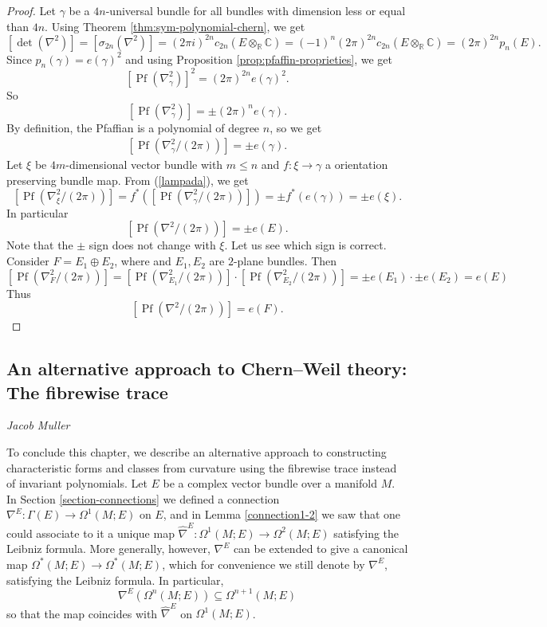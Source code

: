 \documentclass[a4paper,openany]{scrbook}
\newcommand{\chapterauthor}[1]{\hfill\emph{#1}\par\noindent}
\begin{document}
\begin{proof}
    Let $\gamma$ be a $4n$-universal bundle for all bundles with dimension less or equal than $4n$. Using Theorem \ref{thm:sym-polynomial-chern}, we get
    $$[\det(\nabla^2)] = [\sigma_{2n}(\nabla^2)] = (2\pi i)^{2n}c_{2n}(E \otimes_{\mathbb{R}} \mathbb{C}) = (-1)^n(2\pi)^{2n}c_{2n}(E \otimes_{\mathbb{R}} \mathbb{C}) = (2\pi)^{2n}p_n(E).$$
    Since $p_n(\gamma) = e(\gamma)^2$ and using Proposition \ref{prop:pfaffin-proprieties}, we get
    $$[\operatorname{Pf}(\nabla_\gamma^2)]^2 = (2\pi)^{2n}e(\gamma)^2.$$
    So
    $$[\operatorname{Pf}(\nabla_\gamma^2)] = \pm (2\pi)^{n}e(\gamma). $$
    By definition, the Pfaffian is a polynomial of degree $n$, so we get
    \begin{align}
    \label{lampada}
       [\operatorname{Pf}(\nabla_\gamma^2/(2\pi))] = \pm e(\gamma).
    \end{align}
    Let $\xi$ be $4m$-dimensional vector bundle with $m \leq n$ and $f:\xi \rightarrow \gamma$ a orientation preserving bundle map. From (\ref{lampada}), we get
    $$[\operatorname{Pf}(\nabla_\xi^2/(2\pi))] = f^*([\operatorname{Pf}(\nabla_\gamma^2/(2\pi))]) = \pm f^*(e(\gamma)) = \pm e(\xi).$$
    In particular 
    $$[\operatorname{Pf}(\nabla^2/(2\pi))] = \pm e(E).$$
    Note that the $\pm$ sign does not change with $\xi$. Let us see which sign is correct. Consider $F= E_1 \oplus E_2$, where and $E_1,E_2$ are $2$-plane bundles. Then
    $$[\operatorname{Pf}(\nabla_F^2/(2\pi))] = [\operatorname{Pf}(\nabla_{E_1}^2/(2\pi))] \cdot [\operatorname{Pf}(\nabla_{E_2}^2/(2\pi))] = \pm e(E_1)\cdot \pm e(E_2) = e(E)$$
    Thus 
    $$[\operatorname{Pf}(\nabla^2/(2\pi))] = e(F).$$
\end{proof}



\subsection{An alternative approach to Chern--Weil theory: The fibrewise trace}
\chapterauthor{Jacob Muller}


To conclude this chapter, we describe an alternative approach to constructing characteristic forms and classes from curvature using the fibrewise trace instead of invariant polynomials. Let $E$ be a complex vector bundle over a manifold $M$. In Section \ref{section-connections} we defined a connection $\nabla^E:\Gamma(E)\to\Omega^1(M;E)$ on $E$, and in Lemma \ref{connection1-2} we saw that one could associate to it a unique map $\hat{\nabla}^E:\Omega^1(M;E)\to\Omega^2(M;E)$ satisfying the Leibniz formula. More generally, however, $\nabla^E$ can be extended to give a canonical map $\Omega^*(M;E)\to\Omega^*(M;E)$, which for convenience we still denote by $\nabla^E$, satisfying the Leibniz formula. In particular,
\begin{equation*}
\nabla^E(\Omega^n(M;E))\subseteq\Omega^{n+1}(M;E)
\end{equation*}
so that the map coincides with $\hat{\nabla}^E$ on $\Omega^1(M;E)$.
\end{document}
